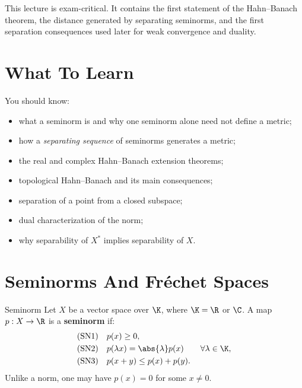 \documentclass[header={Lecture 3 Exam Study Notes}]{study-note}
\begin{document}

\vspace{0.8em}

\begin{focusbox}
This lecture is exam-critical. It contains the first statement of the Hahn--Banach theorem, the distance generated by separating seminorms, and the first separation consequences used later for weak convergence and duality.
\end{focusbox}

\tableofcontents

\section{What To Learn}

\begin{focusbox}
You should know:
\begin{itemize}
\item what a seminorm is and why one seminorm alone need not define a metric;
\item how a \emph{separating sequence} of seminorms generates a metric;
\item the real and complex Hahn--Banach extension theorems;
\item topological Hahn--Banach and its main consequences;
\item separation of a point from a closed subspace;
\item dual characterization of the norm;
\item why separability of $X^*$ implies separability of $X$.
\end{itemize}
\end{focusbox}

\section{Seminorms And Fr\'echet Spaces}

\begin{defbox}{Seminorm}
Let $X$ be a vector space over $\K$, where $\K=\R$ or $\C$. A map $p:X\to\R$ is a \textbf{seminorm} if:
\begin{align*}
\text{(SN1)}\quad & p(x)\ge 0,
\\
\text{(SN2)}\quad & p(\lambda x)=\abs{\lambda}p(x) \qquad \forall \lambda\in\K,
\\
\text{(SN3)}\quad & p(x+y)\le p(x)+p(y).
\end{align*}
Unlike a norm, one may have $p(x)=0$ for some $x\neq 0$.
\end{defbox}
\end{document}
